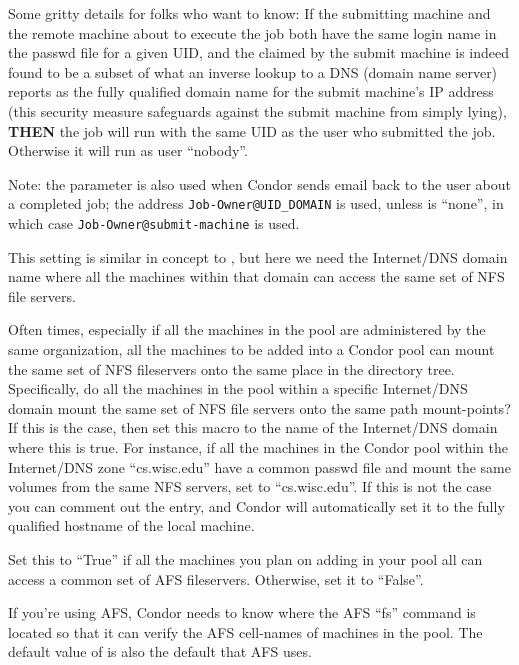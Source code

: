 \begin{description}
  Some gritty details for folks who want to know: If the submitting
  machine and the remote machine about to execute the job both have
  the same login name in the passwd file for a given UID, and the
   claimed by the submit machine is indeed found to
  be a subset of what an inverse lookup to a DNS (domain name server)
  reports as the fully qualified domain name for the submit machine's
  IP address (this security measure safeguards against the submit
  machine from simply lying), \textbf{THEN} the job will run with the
  same UID as the user who submitted the job.  Otherwise it will run
  as user ``nobody''.
          
  Note: the  parameter is also used when Condor
  sends email back to the user about a completed job; the address
  \texttt{Job-Owner@UID\_DOMAIN} is used, unless 
  is ``none'', in which case \texttt{Job-Owner@submit-machine} is
  used.
  
\item[\Macro{FILESYSTEM\_DOMAIN}] \label{param:FilesystemDomain} This
  setting is similar in concept to , but here we
  need the Internet/DNS domain name where all the machines within that
  domain can access the same set of NFS file servers.  
          
  Often times, especially if all the machines in the pool are
  administered by the same organization, all the machines to be added
  into a Condor pool can mount the same set of NFS fileservers onto
  the same place in the directory tree.  Specifically, do all the
  machines in the pool within a specific Internet/DNS domain mount the
  same set of NFS file servers onto the same path mount-points?  If
  this is the case, then set this macro to the name of the
  Internet/DNS domain where this is true.  For instance, if all the
  machines in the Condor pool within the Internet/DNS zone
  ``cs.wisc.edu'' have a common passwd file and mount the same volumes
  from the same NFS servers, set  to
  ``cs.wisc.edu''.  If this is not the case you can comment out the
  entry, and Condor will automatically set it to the fully qualified
  hostname of the local machine.
  
\item[\Macro{HAS\_AFS}] \label{param:HasAfs} Set this to ``True'' if
  all the machines you plan on adding in your pool all can access a
  common set of AFS fileservers.  Otherwise, set it to ``False''.
      
\item[\Macro{FS\_PATHNAME}] \label{param:FsPathname} If you're using
  AFS, Condor needs to know where the AFS ``fs'' command is located so
  that it can verify the AFS cell-names of machines in the pool.  The
  default value of  is also the default that
  AFS uses.
  

\end{description}
